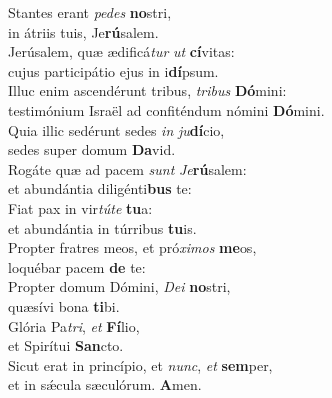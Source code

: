 \evenverse Stantes erant \textit{pe}\textit{des} \textbf{no}stri,~\*\\
\evenverse in átriis tuis, Je\textbf{rú}salem.\\
\oddverse Jerúsalem, quæ ædificá\textit{tur} \textit{ut} \textbf{cí}vitas:~\*\\
\oddverse cujus participátio ejus in i\textbf{dí}psum.\\
\evenverse Illuc enim ascendérunt tribus, \textit{tri}\textit{bus} \textbf{Dó}mini:~\*\\
\evenverse testimónium Israël ad confiténdum nómini \textbf{Dó}mini.\\
\oddverse Quia illic sedérunt sedes \textit{in} \textit{ju}\textbf{dí}cio,~\*\\
\oddverse sedes super domum \textbf{Da}vid.\\
\evenverse Rogáte quæ ad pacem \textit{sunt} \textit{Je}\textbf{rú}salem:~\*\\
\evenverse et abundántia diligénti\textbf{bus} te:\\
\oddverse Fiat pax in vir\textit{tú}\textit{te} \textbf{tu}a:~\*\\
\oddverse et abundántia in túrribus \textbf{tu}is.\\
\evenverse Propter fratres meos, et pró\textit{xi}\textit{mos} \textbf{me}os,~\*\\
\evenverse loquébar pacem \textbf{de} te:\\
\oddverse Propter domum Dómini, \textit{De}\textit{i} \textbf{no}stri,~\*\\
\oddverse quæsívi bona \textbf{ti}bi.\\
\evenverse Glória Pa\textit{tri}, \textit{et} \textbf{Fí}lio,~\*\\
\evenverse et Spirítui \textbf{San}cto.\\
\oddverse Sicut erat in princípio, et \textit{nunc}, \textit{et} \textbf{sem}per,~\*\\
\oddverse et in sǽcula sæculórum. \textbf{A}men.\\
